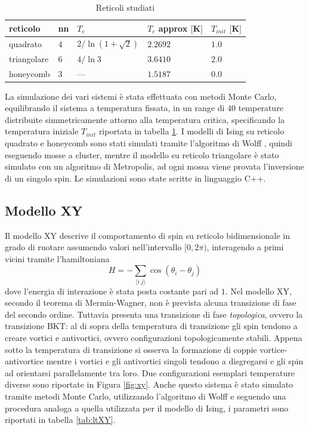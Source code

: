 \documentclass{article}
\begin{document}
\begin{table}[ht]
\begin{center}
\begin{tabular}{lllll}
\toprule
reticolo & nn & $T_c$ & $T_c$ approx $[$\si{K}$]$ & $T_{init}$ $[$\si{K}$]$\\
\midrule
quadrato & $4$ & $2/ \!\ln{(1+\sqrt{2})}$ & $2.2692$ & $1.0$\\
triangolare & $6$ & $4/\!\ln{3}$ & $3.6410 $ & $2.0$\\
honeycomb & $3$ & --- & $1.5187$ & $0.0$\\
\bottomrule
\end{tabular}
\end{center}
\caption{Reticoli studiati}
\label{tab:ltI}
\end{table}

La simulazione dei vari sistemi è stata effettuata con metodi Monte Carlo, equilibrando il sistema a temperatura fissata, in un range di $40$ temperature distribuite simmetricamente attorno alla temperatura critica, specificando la temperatura iniziale $T_{init}$ riportata in tabella \ref{tab:ltI}.
I modelli di Ising su reticolo quadrato e honeycomb sono stati simulati tramite l'algoritmo di Wolff \cite{wolff}, quindi eseguendo mosse a cluster, mentre il modello su reticolo triangolare è stato simulato con un algoritmo di Metropolis, ad ogni mossa viene provata l'inversione di un singolo spin.
Le simulazioni sono state scritte in linguaggio C++.

\subsection{Modello XY}

Il modello XY descrive il comportamento di spin su reticolo bidimensionale in grado di ruotare assumendo valori nell'intervallo $[0,2\pi)$, interagendo a primi vicini tramite l'hamiltoniana
\begin{equation}
H=-\sum_{\langle i~j\rangle} \cos(\theta_i-\theta_j)
\end{equation}
dove l'energia di interazione è stata posta costante pari ad $1$.
Nel modello XY,  secondo il teorema di Mermin-Wagner, non è prevista alcuna transizione di fase del secondo ordine.
Tuttavia presenta una transizione di fase \emph{topologica}, ovvero la transizione BKT\cite{kosterlitz}: al di sopra della temperatura di transizione gli spin tendono a creare vortici e antivortici, ovvero configurazioni topologicamente stabili.
Appena sotto la temperatura di transizione si osserva la formazione di coppie vortice-antivortice mentre i vortici e gli antivortici singoli tendono a disgregarsi e gli spin ad orientarsi parallelamente tra loro.
Due configurazioni esemplari temperature diverse sono riportate in Figura \ref{fig:xy}.
Anche questo sistema è stato simulato tramite metodi Monte Carlo, utilizzando l'algoritmo di Wolff e seguendo una procedura analoga a quella utilizzata per il modello di Ising, i parametri sono riportati in tabella \ref{tab:ltXY}.
\end{document}
